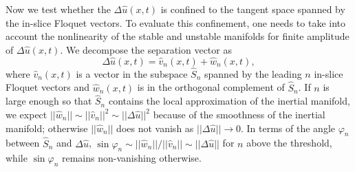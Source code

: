 \documentclass[prl,aps,preprint,showpacs,superscriptaddress]{revtex4-1} %
\begin{document}
Now we test whether the $\Delta{}\hat{u}(x,t)$ is
confined to the tangent space spanned by the {\entangled} in-slice Floquet
vectors. To evaluate this confinement, one needs to take into account the
nonlinearity of the stable and unstable manifolds for finite
amplitude of $\Delta\hat{u}(x,t)$.
We decompose the separation vector as
\begin{equation}
 \Delta\hat{u}(x,t)=\hat{v}_n(x,t)+\hat{w}_n(x,t),  \label{eq:DiffVec}
\end{equation}
where $\hat{v}_n(x,t)$ is a vector in the subspace $\hat{S}_n$ spanned by
the leading $n$ in-slice Floquet vectors and $\hat{w}_n(x,t)$ is in
the orthogonal complement
of $\hat{S}_n$. If $n$ is large enough so that $\hat{S}_n$
contains the local approximation of the inertial manifold, we expect
$||\hat{w}_n||\sim||\hat{v}_n||^2\sim||\Delta\hat{u}||^2$ because of the
smoothness of the inertial manifold;
otherwise $||\hat{w}_n||$ does not vanish as $||\Delta\hat{u}||\to{}0$.
In terms of the angle $\varphi_n$ between $\hat{S}_n$ and
$\Delta\hat{u}$,
$\sin\varphi_n\sim||\hat{w}_n||/||\hat{v}_n||\sim||\Delta\hat{u}||$ for
$n$ above the threshold, while $\sin\varphi_n$ remains non-vanishing
otherwise.
\end{document}
